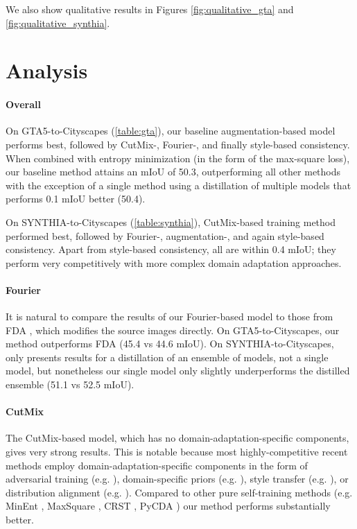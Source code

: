 \documentclass[final]{cvpr}
\begin{document}
We also show qualitative results in Figures \ref{fig:qualitative_gta} and \ref{fig:qualitative_synthia}.

\section{Analysis}

\paragraph{Overall} 

On GTA5-to-Cityscapes (\autoref{table:gta}), our baseline augmentation-based model performs best, followed by CutMix-, Fourier-, and finally style-based consistency. When combined with entropy minimization (in the form of the max-square loss), our baseline method attains an mIoU of 50.3, outperforming all other methods with the exception of a single method using a distillation of multiple models that performs 0.1 mIoU better (50.4). 

On SYNTHIA-to-Cityscapes (\autoref{table:synthia}), CutMix-based training method performed best, followed by Fourier-, augmentation-, and again style-based consistency. Apart from style-based consistency, all are within 0.4 mIoU; they perform very competitively with more complex domain adaptation approaches. 

\paragraph{Fourier} It is natural to compare the results of our Fourier-based model to those from FDA \cite{yang2020fda}, which modifies the source images directly. On GTA5-to-Cityscapes, our method outperforms FDA (45.4 vs 44.6 mIoU). On SYNTHIA-to-Cityscapes, \cite{yang2020fda} only presents results for a distillation of an ensemble of models, not a single model, but nonetheless our single model only slightly underperforms the distilled ensemble (51.1 vs 52.5 mIoU). 

\vspace{-1mm}
\paragraph{CutMix} The CutMix-based model, which has no domain-adaptation-specific components, gives very strong results. This is notable because most highly-competitive recent methods employ domain-adaptation-specific components in the form of adversarial training (e.g. \cite{Wang2020ClassesMA}), domain-specific priors (e.g. \cite{iqbal2020mlsl}), style transfer (e.g. \cite{kim2020learning}), or distribution alignment (e.g. \cite{lee2019sliced}). Compared to other pure self-training methods (e.g. MinEnt \cite{advent}, MaxSquare \cite{maxsquare}, CRST \cite{zou2019confidence}, PyCDA \cite{lian2019constructing}) our method performs substantially better. 
\end{document}
